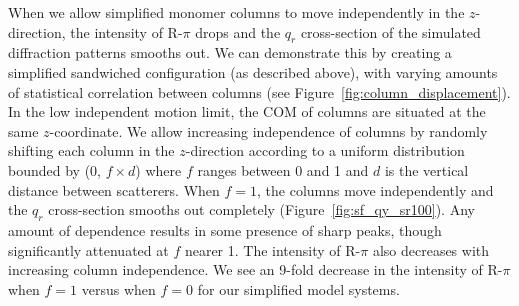 \documentclass[journal=jpcbfk,manuscript=article]{achemso}
\begin{document}
%  
  
  When we allow simplified monomer columns to move independently in the
  $z$-direction, the intensity of R-$\pi$ drops and the $q_r$ cross-section of
  the simulated diffraction patterns smooths out. We can demonstrate this by
  creating a simplified sandwiched configuration (as described above), with
  varying amounts of statistical correlation between columns (see
  Figure~\ref{fig:column_displacement}). In the low independent motion limit, the
  COM of columns are situated at the same $z$-coordinate.  We allow increasing
  independence of columns by randomly shifting each column in the $z$-direction
  according to a uniform distribution bounded by (0, $f \times \mathit{d}$) where
  $f$ ranges between 0 and 1 and $d$ is the vertical distance between scatterers.
  When $f = 1$, the columns move independently and the $q_r$ cross-section
  smooths out completely (Figure~\ref{fig:sf_qy_sr100}). Any amount of dependence
  results in some presence of sharp peaks, though significantly attenuated at $f$
  nearer 1. The intensity of R-$\pi$ also decreases with increasing column
  independence. We see an 9-fold decrease in the intensity of R-$\pi$ when $f=1$
  versus when $f=0$ for our simplified model systems.
\end{document}
